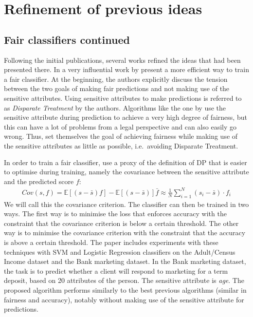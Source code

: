\section{Refinement of previous ideas}%
\label{sec:refinement-on-previous-ideas-for-fair-classification-and-fair-representations}
\subsection{Fair classifiers continued}
Following the initial publications,
several works refined the ideas that had been presented there.
In a very influential work by \citet{zafar2017fairnessconstraints}
present a more efficient way to train a fair classifier.
At the beginning, the authors explicitly discuss the tension
between the two goals of making fair predictions and not making use of the sensitive attributes.
Using sensitive attributes to make predictions
is referred to as \emph{Disparate Treatment} by the authors.
Algorithms like the one by \citet{calders2009building} use the sensitive
attribute during prediction to achieve a very high degree of fairness, but this can have a
lot of problems from a legal perspective and can also easily go wrong.
Thus, \citet{zafar2017fairnessconstraints} set themselves the goal of achieving fairness while making use of the sensitive attributes
as little as possible, i.e.~avoiding Disparate Treatment.

In order to train a fair classifier, \citet{zafar2017fairnessconstraints} use a proxy of the definition of
\ac{DP} that is easier to optimise during training, namely the covariance
between the sensitive attribute and the predicted score \(f\):
\begin{align}
  \label{eq:zafar-constraint}
  Cov(s, f) = \mathbb{E}[(s - \bar{s})f] - \mathbb{E}[(s - \bar{s})]\bar{f} \approx 
  \frac{1}{N} \sum\limits_{i=1}^{N} (s_i - \bar{s}) \cdot f_i
\end{align}
We will call this the covariance criterion.
The classifier can then be trained in two ways.
The first way is to minimise the loss that enforces accuracy
with the constraint that the covariance criterion is below a certain threshold.
The other way is to minimise the covariance criterion
with the constraint that the accuracy is above a certain threshold.
The paper includes experiments with these techniques with SVM and Logistic Regression classifiers
on the Adult/Census Income dataset and the Bank marketing dataset.
In the Bank marketing dataset, the task is to predict whether a client will respond to marketing for a term deposit,
based on 20 attributes of the person.
The sensitive attribute is \emph{age}.
The proposed algorithm performs similarly to the best previous algorithms (similar in fairness and accuracy),
notably without making use of the sensitive attribute for predictions.

